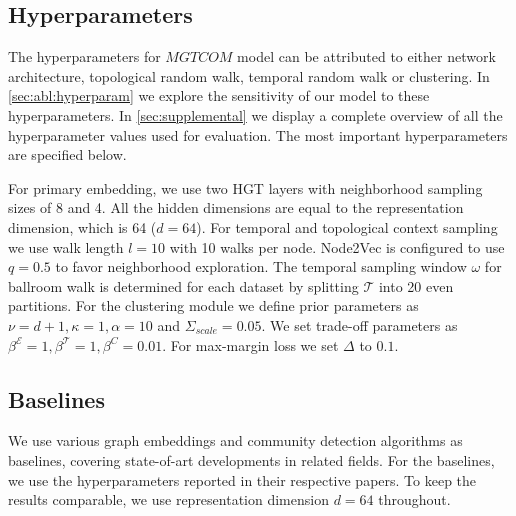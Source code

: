 \subsection{Hyperparameters}
The hyperparameters for $MGTCOM$ model can be attributed to either network architecture, topological random walk, temporal random walk or clustering.
In \cref{sec:abl:hyperparam} we explore the sensitivity of our model to these hyperparameters.
In \cref{sec:supplemental} we display a complete overview of all the hyperparameter values used for evaluation.
The most important hyperparameters are specified below.

For primary embedding, we use two HGT layers with neighborhood sampling sizes of 8 and 4.
All the hidden dimensions are equal to the representation dimension, which is 64 ($d=64$).
For temporal and topological context sampling we use walk length $l=10$ with 10 walks per node.
Node2Vec is configured to use $q=0.5$ to favor neighborhood exploration. 
The temporal sampling window $\omega$ for ballroom walk is determined for each dataset by splitting $\mathcal{T}$ into 20 even partitions.
For the clustering module we define prior parameters as $\nu = d + 1, \kappa = 1, \alpha = 10$ and $\Sigma_{scale} = 0.05$.
We set trade-off parameters as $\beta^{\mathcal{E}} = 1, \beta^{\mathcal{T}} = 1, \beta^{C} = 0.01$. 
For max-margin loss we set $\Delta$ to $0.1$.

\subsection{Baselines} 
We use various graph embeddings and community detection algorithms as baselines, covering state-of-art developments in related fields.
For the baselines, we use the hyperparameters reported in their respective papers. 
To keep the results comparable, we use representation dimension $d=64$ throughout.

